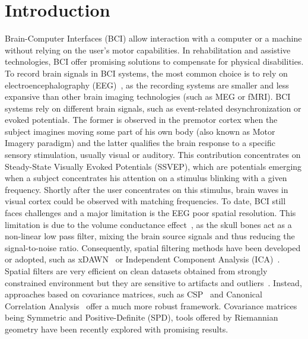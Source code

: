 \section{Introduction}

Brain-Computer Interfaces (BCI) allow interaction with a computer or a machine without relying on the user's motor capabilities.
In rehabilitation and assistive technologies, BCI offer promising solutions to compensate for physical disabilities.
To record brain signals in BCI systems, the most common choice is to rely on electroencephalography (EEG)~\cite{niedermeyer_electroencephalography:_2005}, as the recording systems are smaller and less expansive than other brain imaging technologies (such as MEG or fMRI).
BCI systems rely on different brain signals, such as event-related desynchronization or evoked potentials.
The former is observed in the premotor cortex when the subject imagines moving some part of his own body (also known as Motor Imagery paradigm) and the latter qualifies the brain response to a specific sensory stimulation, usually visual or auditory.
This contribution concentrates on Steady-State Visually Evoked Potentials (SSVEP), which are potentials emerging when a subject concentrates his attention on a stimulus blinking with a given frequency.
Shortly after the user concentrates on this stimulus, brain waves in visual cortex could be observed with matching frequencies.
To date, BCI still faces challenges and a major limitation is the EEG poor spatial resolution.
This limitation is due to the volume conductance effect~\cite{niedermeyer_electroencephalography:_2005}, as the skull bones act as a non-linear low pass filter, mixing the brain source signals and thus reducing the signal-to-noise ratio.
Consequently, spatial filtering methods have been developed or adopted, such as xDAWN~\cite{rivet_xdawn_2009} or Independent Component Analysis (ICA)~\cite{wang_enhancing_2006}.
Spatial filters are very efficient on clean datasets obtained from strongly constrained environment but they are sensitive to artifacts and outliers~\cite{tomioka_logistic_2007}.
Instead, approaches based on covariance matrices, such as CSP~\cite{johannes_designing_1999} and Canonical Correlation Analysis~\cite{kalunga_ssvep_2013} offer a much more robust framework.
Covariance matrices being Symmetric and Positive-Definite (SPD), tools offered by Riemannian geometry have been recently explored with promising results.


